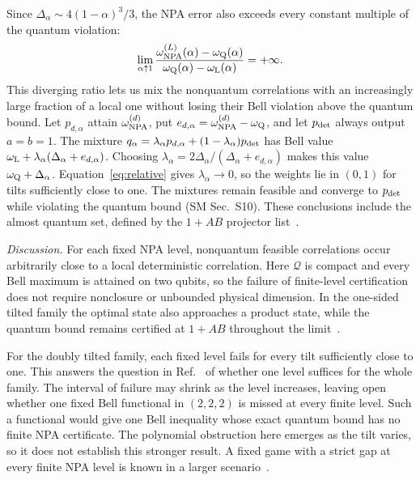 \documentclass[aps,prl,twocolumn,10pt,superscriptaddress,nofootinbib,longbibliography,nobalancelastpage]{revtex4-2}
\newcommand{\Q}{\mathcal Q}
\begin{document}
Since $\Delta_\alpha\sim4(1-\alpha)^3/3$, the NPA error also exceeds every constant multiple of the quantum violation:
\begin{equation}
\lim_{\alpha\uparrow1}
\frac{\omega_{\rm NPA}^{(L)}(\alpha)-\omega_{\rm Q}(\alpha)}
{\omega_{\rm Q}(\alpha)-\omega_{\rm L}(\alpha)}=+\infty.
\label{eq:relative}
\end{equation}
This diverging ratio lets us mix the nonquantum correlations with an increasingly large fraction of a local one without losing their Bell violation above the quantum bound. Let $p_{d,\alpha}$ attain $\omega_{\rm NPA}^{(d)}$, put $e_{d,\alpha}=\omega_{\rm NPA}^{(d)}-\omega_{\rm Q}$, and let $p_{\rm det}$ always output $a=b=1$. The mixture $q_\alpha=\lambda_\alpha p_{d,\alpha}+(1-\lambda_\alpha)p_{\rm det}$ has Bell value $\omega_{\rm L}+\lambda_\alpha(\Delta_\alpha+e_{d,\alpha})$. Choosing $\lambda_\alpha=2\Delta_\alpha/(\Delta_\alpha+e_{d,\alpha})$ makes this value $\omega_{\rm Q}+\Delta_\alpha$. Equation~\eqref{eq:relative} gives $\lambda_\alpha\to0$, so the weights lie in $(0,1)$ for tilts sufficiently close to one. The mixtures remain feasible and converge to $p_{\rm det}$ while violating the quantum bound (SM Sec.~S10). These conclusions include the almost quantum set, defined by the $1+AB$ projector list~\cite{NGHA2015}.

\emph{Discussion.} For each fixed NPA level, nonquantum feasible correlations occur arbitrarily close to a local deterministic correlation. Here $\Q$ is compact and every Bell maximum is attained on two qubits, so the failure of finite-level certification does not require nonclosure or unbounded physical dimension. In the one-sided tilted family the optimal state also approaches a product state, while the quantum bound remains certified at $1+AB$ throughout the limit~\cite{BampsPironio2015}.

For the doubly tilted family, each fixed level fails for every tilt sufficiently close to one. This answers the question in Ref.~\cite{GigenaEtAl2025} of whether one level suffices for the whole family. The interval of failure may shrink as the level increases, leaving open whether one fixed Bell functional in $(2,2,2)$ is missed at every finite level. Such a functional would give one Bell inequality whose exact quantum bound has no finite NPA certificate. The polynomial obstruction here emerges as the tilt varies, so it does not establish this stronger result. A fixed game with a strict gap at every finite NPA level is known in a larger scenario~\cite{FanizzaEtAl2025}.
\end{document}
